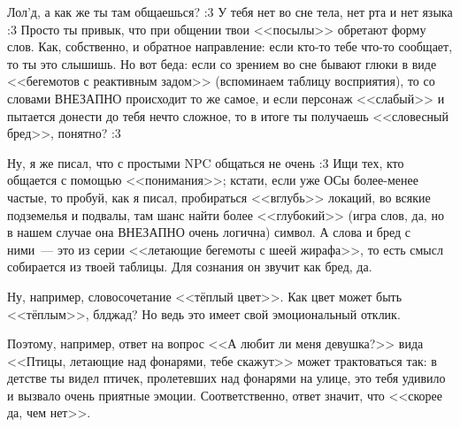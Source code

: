 \documentclass[a5paper,12pt,twoside]{memoir}
\begin{document}
\medskip

Лол'д, а как же ты там общаешься? :3 У тебя нет во сне тела, нет рта и нет языка :3 Просто ты привык, что при общении твои <<посылы>> обретают форму слов. Как, собственно, и обратное направление: если кто-то тебе что-то сообщает, то ты это слышишь. Но вот беда: если со зрением во сне бывают глюки в виде <<бегемотов с реактивным задом>> (вспоминаем таблицу восприятия), то со словами ВНЕЗАПНО происходит то же самое, и если персонаж <<слабый>> и пытается донести до тебя нечто сложное, то в итоге ты получаешь <<словесный бред>>, понятно? :3 

\medskip


\medskip

Ну, я же писал, что с простыми NPC общаться не очень :3 Ищи тех, кто общается с помощью <<понимания>>; кстати, если уже ОСы более-менее частые, то пробуй, как я писал, пробираться <<вглубь>> локаций, во всякие подземелья и подвалы, там шанс найти более <<глубокий>> (игра слов, да, но в нашем случае она ВНЕЗАПНО очень логична) символ. А слова и бред с ними~--- это из серии <<летающие бегемоты с шеей жирафа>>, то есть смысл собирается из твоей таблицы. Для сознания он звучит как бред, да.
 
Ну, например, словосочетание <<тёплый цвет>>. Как цвет может быть <<тёплым>>, блджад? Но ведь это имеет свой эмоциональный отклик.
 
Поэтому, например, ответ на вопрос <<А любит ли меня девушка?>> вида <<Птицы, летающие над фонарями, тебе скажут>> может трактоваться так: в детстве ты видел птичек, пролетевших над фонарями на улице, это тебя удивило и вызвало очень приятные эмоции. Соответственно, ответ значит, что <<скорее да, чем нет>>. 
\end{document}

